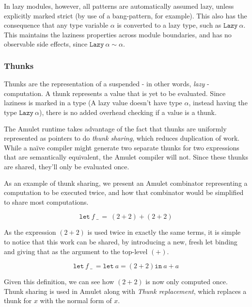 In lazy modules, however, all patterns are automatically assumed lazy, unless explicitly marked strict (by use of a
bang-pattern, for example). This also has the consequence that any type variable $\alpha$ is converted to a lazy type,
such as $\mathtt{Lazy}\ \alpha$. This maintains the laziness properties across module boundaries, and has no
observable side effects, since $\mathtt{Lazy}\ \alpha \sim \alpha$.

\subsubsection{Thunks}

Thunks are the representation of a suspended - in other words, \textit{lazy} - computation. A thunk represents a value
that is yet to be evaluated. Since laziness is marked in a type (A lazy value doesn't have type $\alpha$, instead having
the type $\mathtt{Lazy}\ \alpha$), there is no added overhead checking if a value is a thunk.

The Amulet runtime takes advantage of the fact that thunks are uniformly represented as pointers to do \textit{thunk
  sharing}, which reduces duplication of work. While a na\"{i}ve compiler might generate two separate thunks for two
expressions that are semantically equivalent, the Amulet compiler will not. Since these thunks are shared, they'll only
be evaluated once.

As an example of thunk sharing, we present an Amulet combinator representing a computation to be executed twice, and how
that combinator would be simplified to share most computations.

\[
  \mathtt{let}\ f\ \_\ =\ \left(2 + 2\right) + \left(2 + 2\right)
\]

As the expression $\left(2 + 2\right)$ is used twice in exactly the same terms, it is simple to notice that this work
can be shared, by introducing a new, fresh let binding and giving that as the argument to the top-level
$\left(+\right)$.

\[
  \mathtt{let}\ f\ \_\
             = \mathtt{let}\ a = \left(2 + 2\right)
                \mathtt{in}\ a + a
\]

Given this definition, we can see how $\left(2 + 2\right)$ is now only computed once. Thunk sharing is used in Amulet
along with \textit{Thunk replacement}, which replaces a thunk for $x$ with the normal form of $x$.
